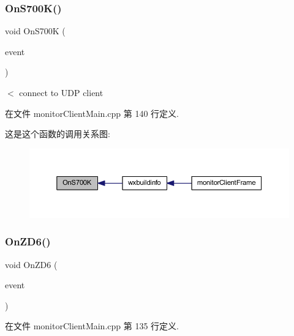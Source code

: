 \subsubsection{\texorpdfstring{On\+S700\+K()}{OnS700K()}}
{\footnotesize\ttfamily void On\+S700K (\begin{DoxyParamCaption}\item[{wx\+Command\+Event \&}]{event }\end{DoxyParamCaption})\hspace{0.3cm}{\ttfamily [private]}}

$<$ connect to U\+DP client 

在文件 monitor\+Client\+Main.\+cpp 第 140 行定义.

这是这个函数的调用关系图\+:\nopagebreak
\begin{figure}[H]
\begin{center}
\leavevmode
\includegraphics[width=350pt]{classmonitor_client_frame_a566bd9bdaa3933a188c130b6d6a166b5_icgraph}
\end{center}
\end{figure}
\mbox{\label{classmonitor_client_frame_a9ceeffc68f5f33c6fd97bba9bfbea284}} 
\subsubsection{\texorpdfstring{On\+Z\+D6()}{OnZD6()}}
{\footnotesize\ttfamily void On\+Z\+D6 (\begin{DoxyParamCaption}\item[{wx\+Command\+Event \&}]{event }\end{DoxyParamCaption})\hspace{0.3cm}{\ttfamily [private]}}



在文件 monitor\+Client\+Main.\+cpp 第 135 行定义.

